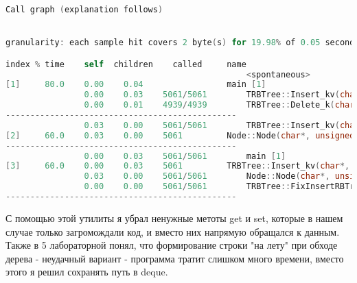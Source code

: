 \begin{lstlisting}[language=C]
 Call graph (explanation follows)


granularity: each sample hit covers 2 byte(s) for 19.98% of 0.05 seconds

index % time    self  children    called     name
                                                 <spontaneous>
[1]     80.0    0.00    0.04                 main [1]
                0.00    0.03    5061/5061        TRBTree::Insert_kv(char*, unsigned long long) [3]
                0.00    0.01    4939/4939        TRBTree::Delete_k(char*) [5]
-----------------------------------------------
                0.03    0.00    5061/5061        TRBTree::Insert_kv(char*, unsigned long long) [3]
[2]     60.0    0.03    0.00    5061         Node::Node(char*, unsigned long long) [2]
-----------------------------------------------
                0.00    0.03    5061/5061        main [1]
[3]     60.0    0.00    0.03    5061         TRBTree::Insert_kv(char*, unsigned long long) [3]
                0.03    0.00    5061/5061        Node::Node(char*, unsigned long long) [2]
                0.00    0.00    5061/5061        TRBTree::FixInsertRBTree(Node*) [13]
-----------------------------------------------
\end{lstlisting}

С помощью этой утилиты я убрал ненужные метоты get и set, которые в нашем случае только загромождали код, и вместо них напрямую обращался к данным. Также в 5 лабораторной понял, что формирование строки "на лету" при обходе дерева - неудачный вариант - программа тратит слишком много времени, вместо этого я решил сохранять путь в deque. 
\pagebreak

